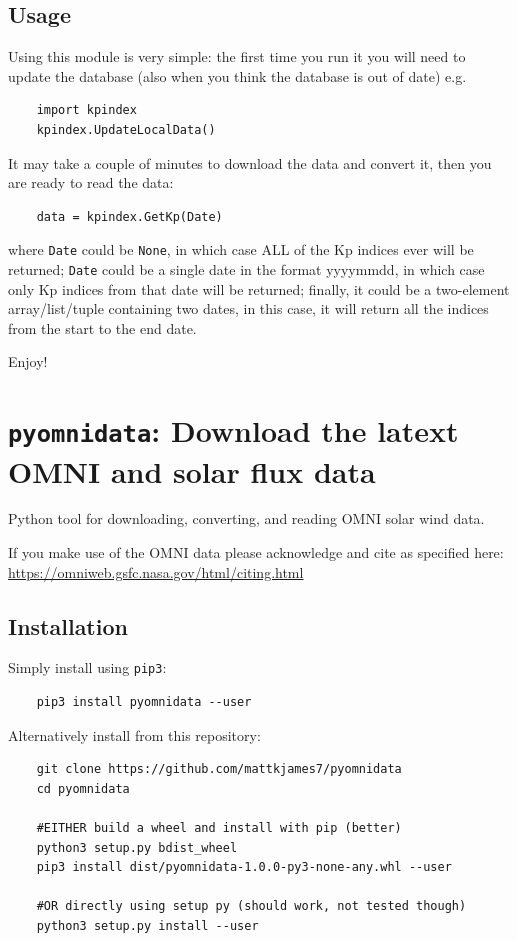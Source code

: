 	\subsection{Usage}
	
	Using this module is very simple: the first time you run it you will 
	need to update the database (also when you think the database is out of 
	date) e.g.
	
	\begin{verbatim}
	import kpindex
	kpindex.UpdateLocalData()
	\end{verbatim}
	
	It may take a couple of minutes to download the data and convert it, 
	then you are ready to read the data:
	
	\begin{verbatim}
	data = kpindex.GetKp(Date)
	\end{verbatim}
	
	where \texttt{Date} could be \texttt{None}, in which case ALL of the Kp indices ever
	will be returned; \texttt{Date} could be a single date in the format yyyymmdd,
	in which case only Kp indices from that date will be returned; finally,
	it could be a two-element array/list/tuple containing two dates, in this
	case, it will return all the indices from the start to the end date.
	
	Enjoy!
	

	\section{\texttt{pyomnidata}: Download the latext OMNI and solar flux data}


	Python tool for downloading, converting, and reading OMNI solar wind data.
	
	If you make use of the OMNI data please acknowledge and cite as specified here: \url{https://omniweb.gsfc.nasa.gov/html/citing.html}
	
	\subsection{Installation}
	
	Simply install using \texttt{pip3}:
	
	\begin{verbatim}
	pip3 install pyomnidata --user
	\end{verbatim}
	
	Alternatively install from this repository:
	
	\begin{verbatim}
	git clone https://github.com/mattkjames7/pyomnidata
	cd pyomnidata
	
	#EITHER build a wheel and install with pip (better)
	python3 setup.py bdist_wheel
	pip3 install dist/pyomnidata-1.0.0-py3-none-any.whl --user
	
	#OR directly using setup py (should work, not tested though)
	python3 setup.py install --user
	\end{verbatim}
	
